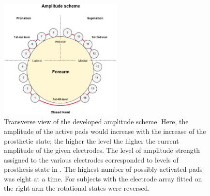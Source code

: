 \begin{figure}[H]                 
	\includegraphics[width=0.55\textwidth]{figures/El_array_amplitude}  
	\caption{Transverse view of the developed amplitude scheme. Here, the amplitude of the active pads would increase with the increase of the prosthetic state; the higher the level the higher the current amplitude of the given electrodes. The level of amplitude strength assigned to the various electrodes corresponded to levels of prosthesis state in . The highest number of possibly activated pads was eight at a time.  For subjects with the electrode array fitted on the right arm the rotational states were reversed.}
	\label{fig:amplitude} 
\end{figure}






